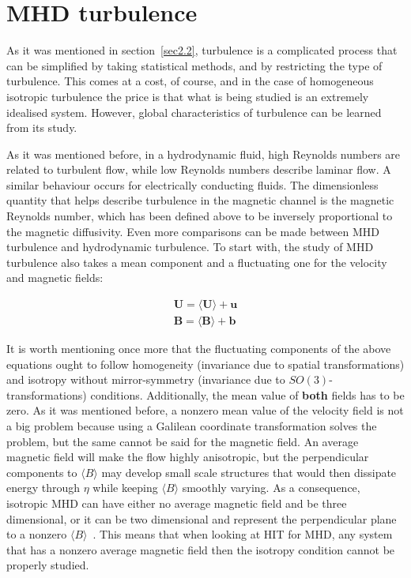 \documentclass[12pt,a4paper]{report}
\begin{document}
\section{MHD turbulence}
\label{sec3.2}

As it was mentioned in section~\ref{sec2.2}, turbulence is a complicated process that can be simplified by taking statistical methods, and by restricting the type of turbulence. This comes at a cost, of course, and in the case of homogeneous isotropic turbulence the price is that what is being studied is an extremely idealised system. However, global characteristics of turbulence can be learned from its study.

As it was mentioned before, in a hydrodynamic fluid, high Reynolds numbers are related to turbulent flow, while low Reynolds numbers describe laminar flow. A similar behaviour occurs for electrically conducting fluids. The dimensionless quantity that helps describe turbulence in the magnetic channel is the magnetic Reynolds number, which has been defined above to be inversely proportional to the magnetic diffusivity. Even more comparisons can be made between MHD turbulence and hydrodynamic turbulence. To start with, the study of MHD turbulence also takes a mean component and a fluctuating one for the velocity and magnetic fields:

\begin{align}
 \bm U = \langle \bm U \rangle + \bm u \nonumber \\
 \bm B = \langle \bm B \rangle + \bm b \nonumber
\end{align}

It is worth mentioning once more that the fluctuating components of the above equations ought to follow homogeneity (invariance due to spatial transformations) and isotropy without mirror-symmetry (invariance due to $SO(3)$-transformations) conditions. Additionally, the mean value of \textbf{both} fields has to be zero. As it was mentioned before, a nonzero mean value of the velocity field is not a big problem because using a Galilean coordinate transformation solves the problem, but the same cannot be said for the magnetic field. An average magnetic field will make the flow highly anisotropic, but the perpendicular components to $\langle B \rangle$ may develop small scale structures that would then dissipate energy through $\eta$ while keeping $\langle B \rangle$ smoothly varying. As a consequence, isotropic MHD can have either no average magnetic field and be three dimensional, or it can be two dimensional and represent the perpendicular plane to a nonzero $\langle B \rangle$~\cite{biskamp1997nonlinear}. This means that when looking at HIT for MHD, any system that has a nonzero average magnetic field then the isotropy condition cannot be properly studied. 
\end{document}
